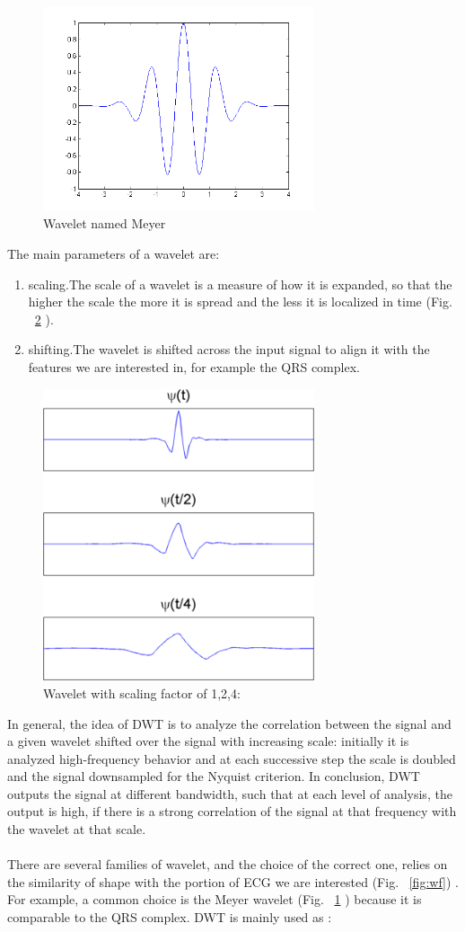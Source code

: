 \documentclass[LaM,binding=0.6cm]{sapthesis}
\begin{document}
\begin{figure}  \centering
    \includegraphics[width=80mm,scale=0.7]{waveletexample.png}
    \caption{Wavelet named Meyer}
    \label{fig:we}
\end{figure}
The main parameters of a wavelet are:
\begin{enumerate}
\item scaling.The scale of a wavelet is a measure of how it is expanded, so that the higher the scale the more it is spread and the less it is localized in time (Fig. ~\ref{fig:ws} ).
\item shifting.The wavelet is shifted across the input signal to align it with the features we are interested in, for example the QRS complex.
\end{enumerate}
\begin{figure} \centering
    \includegraphics[width=80mm,scale=0.7]{wavescale.png}
    \caption{Wavelet with scaling factor of 1,2,4: \cite{matdwt} }
    \label{fig:ws}
\end{figure}
In general, the idea of DWT is to analyze the correlation between the signal and a given wavelet shifted over the signal with increasing scale: initially it is analyzed high-frequency behavior and at each successive step the scale is doubled and the signal downsampled for the Nyquist criterion. In conclusion, DWT outputs the signal at different bandwidth, such that at each level of analysis, the output is high, if there is a strong correlation of the signal at that frequency with the wavelet at that scale.\\\\There are several families of wavelet, and the choice of the correct one, relies on the similarity of shape with the portion of ECG we are interested (Fig. ~\ref{fig:wf}) . For example, a common choice is the Meyer wavelet (Fig. ~\ref{fig:we} ) because it is comparable to the QRS complex. DWT is mainly used as :
\end{document}
